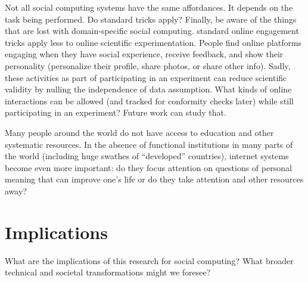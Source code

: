 Not all social computing systems have the same affordances. It depends on the task being performed. Do standard tricks apply? Finally, be aware of the things that are lost with domain-specific social computing. standard online engagement tricks apply less to online scientific experimentation. People find online platforms engaging when they have social experience, receive feedback, and show their personality (personalize their profile, share photos, or share other info). Sadly, these activities as part of participating in an experiment can reduce scientific validity by nulling the independence of data assumption. What kinds of online interactions can be allowed (and tracked for conformity checks later) while still participating in an experiment? Future work can study that.

Many people around the world do not have access to education and other systematic resources. In the absence of functional institutions in many parts of the world (including huge swathes of “developed” countries), internet systems become even more important:  do they focus attention on questions of personal meaning that can improve one’s life or do they take attention and other resources away?


\section{Implications}

What are the implications of this research for social computing? What broader technical and societal transformations might we foresee?

